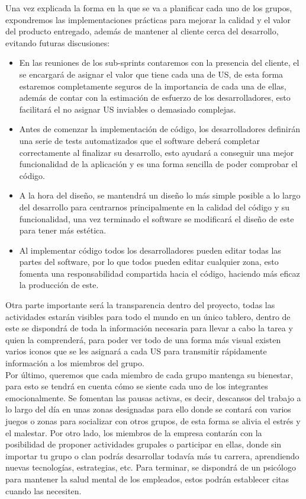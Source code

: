 Una vez explicada la forma en la que se va a planificar cada uno de los grupos, expondremos las implementaciones prácticas para mejorar la calidad y el valor del producto entregado, además de mantener al cliente cerca del desarrollo, evitando futuras discusiones:
\begin{itemize}
    \item En las reuniones de los sub-sprints contaremos con la presencia del cliente, el se encargará de asignar el valor que tiene cada una de US, de esta forma estaremos completamente seguros de la importancia de cada una de ellas, además de contar con la estimación de esfuerzo de los desarrolladores, esto facilitará el no asignar US inviables o demasiado complejas.

    \item Antes de comenzar la implementación de código, los desarrolladores definirán una serie de tests automatizados que el software deberá completar correctamente al finalizar su desarrollo, esto ayudará a conseguir una mejor funcionalidad de la aplicación y es una forma sencilla de poder comprobar el código.

    \item A la hora del diseño, se mantendrá un diseño lo más simple posible a lo largo del desarrollo para centrarnos principalmente en la calidad del código y su funcionalidad, una vez terminado el software se modificará el diseño de este para tener más estética.

    \item Al implementar código todos los desarrolladores pueden editar todas las partes del software, por lo que todos pueden editar cualquier zona, esto fomenta una responsabilidad compartida hacia el código, haciendo más eficaz la producción de este.
\end{itemize}

Otra parte importante será la transparencia dentro del proyecto, todas las actividades estarán visibles para todo el mundo en un único tablero, dentro de este se dispondrá de toda la información necesaria para llevar a cabo la tarea y quien la comprenderá, para poder ver todo de una forma más visual existen varios iconos que se les asignará a cada US para transmitir rápidamente información a los miembros del grupo.\\

Por último, queremos que cada miembro de cada grupo mantenga su bienestar, para esto se tendrá en cuenta cómo se siente cada uno de los integrantes emocionalmente. Se fomentan las pausas activas, es decir, descansos del trabajo a lo largo del día en unas zonas designadas para ello donde se contará con varios juegos o zonas para socializar con otros grupos, de esta forma se alivia el estrés y el malestar. Por otro lado, los miembros de la empresa contarán con la posibilidad de proponer actividades grupales o participar en ellas, donde sin importar tu grupo o clan podrás desarrollar todavía más tu carrera, aprendiendo nuevas tecnologías, estrategias, etc. Para terminar, se dispondrá de un psicólogo para mantener la salud mental de los empleados, estos podrán establecer citas cuando las necesiten.
